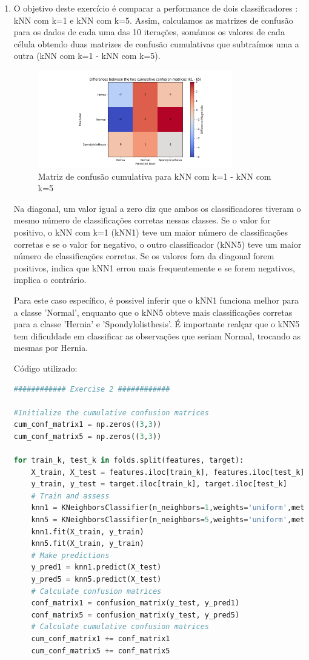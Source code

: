 \documentclass[a4paper,12pt]{article} %
\begin{document}
\begin{enumerate}
    \item O objetivo deste exercício é comparar a performance de dois classificadores : kNN com k=1 e kNN com k=5. 
    Assim, calculamos as matrizes de confusão para os dados de cada uma das 10 iterações, somámos os valores de cada célula obtendo duas matrizes de confusão cumulativas que subtraímos uma a outra (kNN com k=1 - kNN com k=5).
    \begin{figure}[H]
        \centering
        \includegraphics[width=0.8\textwidth]{ex2_cummatrix.png}
        \caption{Matriz de confusão cumulativa para kNN com k=1 - kNN com k=5}
        \label{fig:ex2a}
    \end{figure}

    Na diagonal, um valor igual a zero diz que ambos os classificadores tiveram o mesmo número de classificações corretas nessas classes. Se o valor for positivo, o kNN com k=1 (kNN1) teve um maior número de classificações corretas e se o valor for negativo, o outro classificador (kNN5) teve um maior número de classificações corretas. Se os valores fora da diagonal forem positivos, indica que kNN1 errou mais frequentemente e se forem negativos, implica o contrário. 

Para este caso específico, é possivel inferir que o kNN1 funciona melhor para a classe 'Normal', enquanto que o kNN5 obteve mais classificações corretas para a classe 'Hernia' e 'Spondylolisthesis'. É importante realçar que o kNN5 tem dificuldade em classificar as observações que seriam Normal, trocando as mesmas por Hernia.

    Código utilizado:
    \begin{lstlisting}[language=Python]
############ Exercise 2 ############

#Initialize the cumulative confusion matrices
cum_conf_matrix1 = np.zeros((3,3))
cum_conf_matrix5 = np.zeros((3,3))
        
for train_k, test_k in folds.split(features, target):
    X_train, X_test = features.iloc[train_k], features.iloc[test_k]
    y_train, y_test = target.iloc[train_k], target.iloc[test_k]  
    # Train and assess
    knn1 = KNeighborsClassifier(n_neighbors=1,weights='uniform',metric='euclidean')
    knn5 = KNeighborsClassifier(n_neighbors=5,weights='uniform',metric='euclidean')
    knn1.fit(X_train, y_train)
    knn5.fit(X_train, y_train)
    # Make predictions
    y_pred1 = knn1.predict(X_test)
    y_pred5 = knn5.predict(X_test)
    # Calculate confusion matrices
    conf_matrix1 = confusion_matrix(y_test, y_pred1)
    conf_matrix5 = confusion_matrix(y_test, y_pred5)
    # Calculate cumulative confusion matrices
    cum_conf_matrix1 += conf_matrix1
    cum_conf_matrix5 += conf_matrix5


\end{lstlisting}
\end{enumerate}
\end{document}
